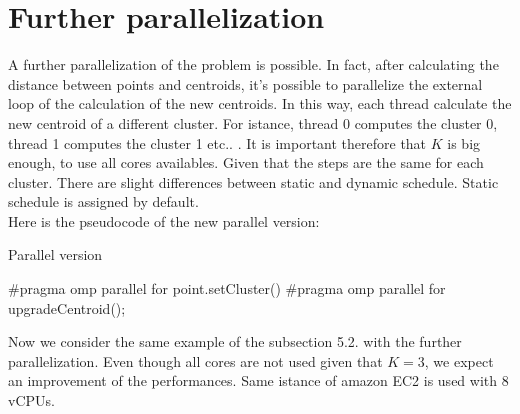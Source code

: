 \documentclass[10pt,twocolumn,letterpaper]{article}
\begin{document}
\section{Further parallelization}
A further parallelization of the problem is possible. In fact, after calculating the distance between points and centroids, it's possible to
parallelize the external loop of the calculation of the new centroids. In this way, each thread calculate the new centroid of a different cluster.
For istance, thread 0 computes the cluster 0, thread 1 computes the cluster 1 etc.. . It is important therefore that $K$ is big enough, to use 
all cores availables. Given that the steps are the same for each cluster. There are slight differences between static and dynamic schedule.
Static schedule is assigned by default.\\
Here is the pseudocode of the new parallel version:
\begin{algorithm}
\label{newparallelo}
\caption{Parallel version}
\begin{algorithmic}
		\State \#pragma omp parallel for
			\State point.setCluster()
		\EndFor
		\State \#pragma omp parallel for
    		\State upgradeCentroid();
		\EndFor
   	 \EndWhile
\end{algorithmic}
\end{algorithm}

 Now we consider the same example of the subsection 5.2. with the further parallelization. Even though all cores are not used given 
that $K=3$, we expect an improvement of the performances. Same istance of amazon EC2 is used with
8 vCPUs. \\
\end{document}

